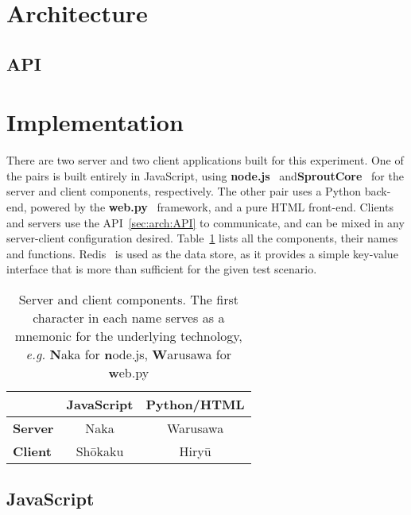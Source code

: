 \documentclass[letterpaper,twocolumn,10pt,draft]{article}
\begin{document}
\section{\label{sec:arch}Architecture}

\subsection{\label{sec:arch:API}API}

\section{\label{sec:impl}Implementation}

There are two server and two client applications built for this experiment. One of the pairs is built entirely in JavaScript, using \textbf{node.js}~\cite{node} and\textbf{SproutCore}~\cite{sprout} for the server and client components, respectively. The other pair uses a Python back-end, powered by the \textbf{web.py}~\cite{webpy} framework, and a pure HTML front-end. Clients and servers use the API~\ref{sec:arch:API} to communicate, and can be mixed in any server-client configuration desired. Table~\ref{tab:comps} lists all the components, their names and functions. Redis~\cite{redis} is used as the data store, as it provides a simple key-value interface that is more than sufficient for the given test scenario.

\begin{table}
    \begin{center}
        \begin{tabular}{l|cc}
            \toprule
            & \textbf{JavaScript} & \textbf{Python/HTML} \\
            \midrule
            \textbf{Server} & Naka & Warusawa \\
            \textbf{Client} & Sh\={o}kaku & Hiry\={u}\\
            \bottomrule
        \end{tabular}
        \caption{Server and client components. The first character in each name serves as a mnemonic for the underlying technology, \emph{e.g.} \textbf{N}aka for \textbf{n}ode.js, \textbf{W}arusawa for \textbf{w}eb.py}
        \label{tab:comps}
    \end{center}
\end{table}

\subsection{\label{sec:impl:js}JavaScript}
\end{document}

